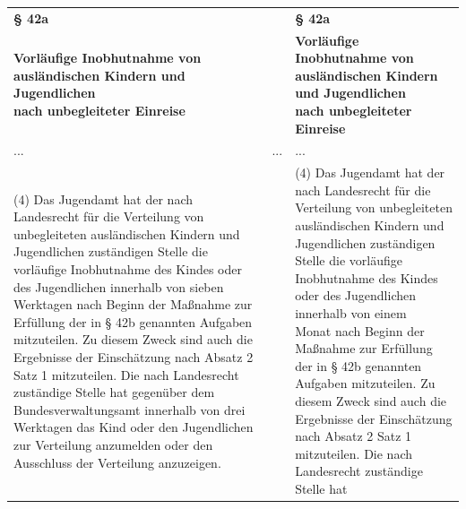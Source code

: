 \documentclass[10pt,a4paper,landscape]{article}
\begin{document}
\begin{longtable}{|L{8.2cm}|L{8.2cm}|L{8.2cm}|}
\hhline{|---|}
\textbf{\S{} 42a} &  & \textbf{\S{} 42a} \\
\hhline{|---|}
\textbf{Vorläufige Inobhutnahme von  \newline ausländischen Kindern und Jugendlichen  \newline nach unbegleiteter Einreise} &  & \textbf{Vorläufige Inobhutnahme von  \newline ausländischen Kindern und Jugendlichen  \newline nach unbegleiteter Einreise} \\
\hhline{|---|}
... & ... & ... \\
\hhline{|---|}
(4) Das Jugendamt hat der nach  \newline Landesrecht für die Verteilung von  \newline unbegleiteten ausländischen Kindern und  \newline Jugendlichen zuständigen Stelle die  \newline vorläufige Inobhutnahme des Kindes oder  \newline des Jugendlichen innerhalb von \textcolor{diffred}{sieben  \newline Werktagen} nach Beginn der Maßnahme  \newline zur Erfüllung der in \S{} 42b genannten  \newline Aufgaben mitzuteilen. Zu diesem Zweck  \newline sind auch die Ergebnisse der Einschätzung  \newline nach Absatz 2 Satz 1 mitzuteilen. Die nach  \newline Landesrecht zuständige Stelle hat  \newline gegenüber dem Bundesverwaltungsamt  \newline innerhalb von drei Werktagen das Kind  \newline oder den Jugendlichen zur Verteilung  \newline anzumelden oder den Ausschluss der  \newline Verteilung anzuzeigen. &  & (4) Das Jugendamt hat der nach  \newline Landesrecht für die Verteilung von  \newline unbegleiteten ausländischen Kindern und  \newline Jugendlichen zuständigen Stelle die  \newline vorläufige Inobhutnahme des Kindes oder  \newline des Jugendlichen innerhalb von \textcolor{diffgreen}{einem  \newline Monat} nach Beginn der Maßnahme zur  \newline Erfüllung der in \S{} 42b genannten Aufgaben  \newline mitzuteilen. Zu diesem Zweck sind auch  \newline die Ergebnisse der Einschätzung nach  \newline Absatz 2 Satz 1 mitzuteilen. Die nach  \newline Landesrecht zuständige Stelle hat  
\end{longtable}
\end{document}
